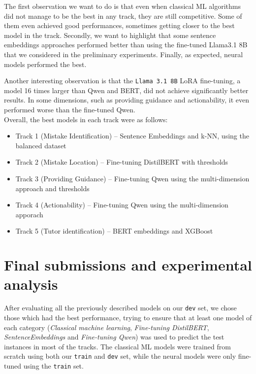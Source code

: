 \documentclass[11pt]{article}
\begin{document}
The first observation we want to do is that even when classical ML algorithms did not manage to be the best in any track, they are still competitive.
Some of them even achieved good performances, sometimes getting closer to the best model in the track.
Secondly, we want to highlight that some sentence embeddings approaches performed better than using the fine-tuned Llama3.1 8B that we considered in the preliminary experiments.
Finally, as expected, neural models performed the best.

Another interesting observation is that the \texttt{Llama 3.1 8B} LoRA fine-tuning, a model 16 times larger than Qwen and BERT, did not achieve significantly better results.
In some dimensions, such as providing guidance and actionability, it even performed worse than the fine-tuned Qwen.\\


Overall, the best models in each track were as follows: 
\begin{itemize}
    \setlength\itemsep{0em}
    \item Track 1 (Mistake Identification) -- Sentence Embeddings and k-NN, using the balanced dataset
    \item Track 2 (Mistake Location) -- Fine-tuning DistilBERT with thresholds
    \item Track 3 (Providing Guidance) -- Fine-tuning Qwen using the multi-dimension approach and thresholds
    \item Track 4 (Actionability) -- Fine-tuning Qwen using the multi-dimension apporach
    \item Track 5 (Tutor identification) -- BERT embeddings and XGBoost
\end{itemize}


\section{Final submissions and experimental analysis}
\label{sec:analysis}

After evaluating all the previously described models on our \texttt{dev} set, we chose those which had the best performance, trying to ensure that at least one model of each category (\textit{Classical machine learning}, \textit{Fine-tuning DistilBERT}, \textit{SentenceEmbeddings} and \textit{Fine-tuning Qwen}) was used to predict the test instances in most of the tracks.
The classical ML models were trained from scratch using both our \texttt{train} and \texttt{dev} set, while the neural models were only fine-tuned using the \texttt{train} set.
\end{document}
